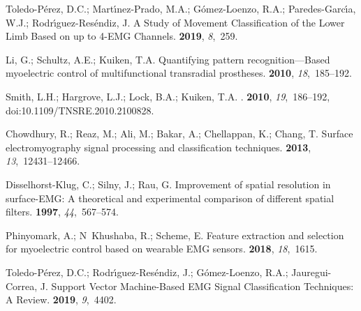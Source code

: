\documentclass[sensors,review,accept,moreauthors,pdftex]{Definitions/mdpi}
\begin{document}
\begin{thebibliography}{999}
Toledo-P{\'e}rez, D.C.; Mart{\'\i}nez-Prado, M.A.; G{\'o}mez-Loenzo, R.A.;
  Paredes-Garc{\'\i}a, W.J.; Rodr{\'\i}guez-Res{\'e}ndiz, J.
\newblock A Study of Movement Classification of the Lower Limb Based on up to
  4-EMG Channels.
 {\bf 2019}, {\em 8},~259.

Li, G.; Schultz, A.E.; Kuiken, T.A.
\newblock Quantifying pattern recognition—Based myoelectric control of
  multifunctional transradial prostheses.
 {\bf 2010}, {\em 18},~185--192.

Smith, L.H.; Hargrove, L.J.; Lock, B.A.; Kuiken, T.A.
.
 {\bf 2010}, {\em 19},~186--192, doi:10.1109/TNSRE.2010.2100828.

Chowdhury, R.; Reaz, M.; Ali, M.; Bakar, A.; Chellappan, K.; Chang, T.
\newblock Surface electromyography signal processing and classification
  techniques.
 {\bf 2013}, {\em 13},~12431--12466.

Disselhorst-Klug, C.; Silny, J.; Rau, G.
\newblock Improvement of spatial resolution in surface-EMG: A theoretical and
  experimental comparison of different spatial filters.
 {\bf 1997}, {\em
  44},~567--574.

Phinyomark, A.; N~Khushaba, R.; Scheme, E.
\newblock Feature extraction and selection for myoelectric control based on
  wearable EMG sensors.
 {\bf 2018}, {\em 18},~1615.

Toledo-P{\'e}rez, D.C.; Rodr{\'\i}guez-Res{\'e}ndiz, J.; G{\'o}mez-Loenzo,
  R.A.; Jauregui-Correa, J.
\newblock Support Vector Machine-Based EMG Signal Classification Techniques: A
  Review.
 {\bf 2019}, {\em 9},~4402.


\end{thebibliography}
\end{document}

